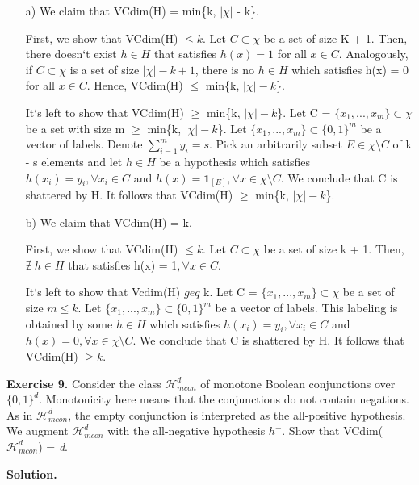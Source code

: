 \documentclass{article}
\newcommand{\<}{\langle}
\renewcommand{\>}{\rangle}
\theoremstyle{definition}
\begin{document}
\begin{itemize}
    \item[a)] We claim that VCdim(H) = min\{k, $|\chi|$ - k\}.
    
    First, we show that VCdim(H) $\leq k$. Let $C \subset \chi$ be a set of size K + 1. Then, there doesn`t exist $h \in H$ that satisfies $h(x) = 1$ for all $x \in C$. Analogously, if $C \subset \chi$ is a set of size $|\chi| - k + 1$, there is no $h \in H$ which satisfies h(x) = 0 for all $x \in C$. Hence, VCdim(H) $\leq$ min\{k, $|\chi| - k$\}.
    
    It`s left to show that VCdim(H) $\geq$ min\{k, $|\chi| - k$\}. Let C = $\{x_1, ...,x_m\} \subset \chi$ be a set with size m $\geq$ min\{k, $|\chi| - k$\}. Let $\{x_1, ...,x_m\} \subset \{0,1\}^m$ be a vector of labels. Denote $\sum_{i=1}^{m} y_i = s$. Pick an arbitrarily subset $E \in \chi \setminus C$ of k - s elements and let $h \in H$ be a hypothesis which satisfies $h(x_i) = y_i, \forall x_i \in C$ and $h(x) = \textbf{1}_{[E]}, \forall x \in \chi \setminus C$. We conclude that C is shattered by H. It follows that VCdim(H) $\geq$ min\{k, $|\chi| - k$\}.
    
    \item[b)] We claim that VCdim(H) = k.
    
    First, we show that VCdim(H) $\leq k$. Let $C \subset \chi$ be a set of size k + 1. Then, $\nexists \ h \in H$ that satisfies h(x) = 1$, \forall x \in C$.
    
    It`s left to show that Vcdim(H) $geq$ k. Let C = $\{x_1, ...,x_m\} \subset \chi$ be a set of size $m \leq k$. Let $\{x_1, ...,x_m\} \subset \{0,1\}^m$ be a vector of labels. This labeling is obtained by some $h \in H$ which satisfies $h(x_i) = y_i, \forall x_i \in C$ and $h(x) = 0, \forall x \in \chi \setminus C$. We conclude that C is shattered by H. It follows that VCdim(H) $\geq k$. 
\end{itemize}

\vspace{3mm}

\textbf{Exercise 9.} Consider the class $\mathcal{H}^{d}_{mcon}$ of monotone Boolean conjunctions over $\{0,1\}^{d}$. Monotonicity here means that the conjunctions do not contain negations. As in $\mathcal{H}^{d}_{mcon}$, the empty conjunction is interpreted as the all-positive hypothesis. We augment $\mathcal{H}^{d}_{mcon}$ with the all-negative hypothesis $h^{-}$. Show that VCdim($\mathcal{H}^{d}_{mcon}$) = \textit{d}.

\textbf{Solution.}
\end{document}
